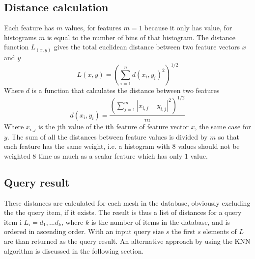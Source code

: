 \documentclass{bigdata}
\begin{document}
\subsection{Distance calculation}
Each feature has $m$ values, for  features $m = 1$ because it only has value, for histograms $m$ is equal to the number of bins of that histogram. The distance function $L_(x,y)$ gives the total euclidean distance between two feature vectors $x$ and $y$
\begin{equation}
L(x,y) = \left(\sum\limits_{i=1}^nd(x_i,y_i)^2\right)^{1/2}
\end{equation}
Where $d$ is a function that calculates the distance between two features
\begin{equation}
d(x_i,y_i) = \frac{\left(\sum\limits_{j=1}^m|x_{i,j}-y_{i,j}|^2\right)^{1/2}}{m}
\end{equation}
Where $x_{i,j}$ is the jth value of the ith feature of feature vector $x$, the same case for $y$. The sum of all the distances between feature values is divided by $m$ so that each feature has the same weight, i.e. a histogram with 8 values should not be weighted 8 time as much as a scalar feature which has only 1 value.  

\subsection{Query result}
These distances are calculated for each mesh in the database, obviously excluding the the query item, if it exists. The result is thus a list of distances for a query item i $L_i = {d_1, ... d_k}$, where $k$ is the number of items in the database, and is ordered in ascending order. With an input query size $s$ the first $s$ elements of $L$ are than returned as the query result. An alternative approach by using the KNN algorithm is discussed in the following section. 
\end{document}
